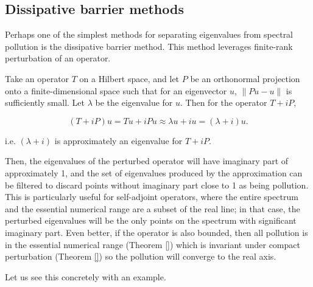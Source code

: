 \documentclass[../main.tex]{subfiles}
\begin{document}
\subsection{Dissipative barrier methods}\label{sec:dissipative-barrier}
Perhaps one of the simplest methods for separating eigenvalues from spectral pollution is the dissipative barrier method.
This method leverages finite-rank perturbation of an operator.

Take an operator $T$ on a Hilbert space, and
let $P$ be an orthonormal projection onto a finite-dimensional space  such that for an eigenvector $u$, $\|Pu - u\|$ is sufficiently small.
Let $\lambda$ be the eigenvalue for $u$. Then for the operator $T+iP$,

$$(T+iP) u = Tu + iPu \approx \lambda u + iu = (\lambda + i)u.$$

i.e. $(\lambda + i)$ is approximately an eigenvalue for $T+iP$. 

Then, the eigenvalues of the perturbed operator will have imaginary part of approximately 1, and the set of eigenvalues produced by the approximation 
can be filtered to discard points without imaginary part close to 1 as being pollution. This is particularly useful for self-adjoint operators, where the entire spectrum and the essential numerical range are a subset of the real line; in that case, the perturbed eigenvalues will be the only points on the spectrum with significant imaginary part. Even better, if the operator is also bounded, then all pollution is in the essential numerical range (Theorem \ref{}) which is
invariant under compact perturbation (Theorem \ref{}) so the pollution will converge to the real axis.

Let us see this concretely with an example.
\end{document}

